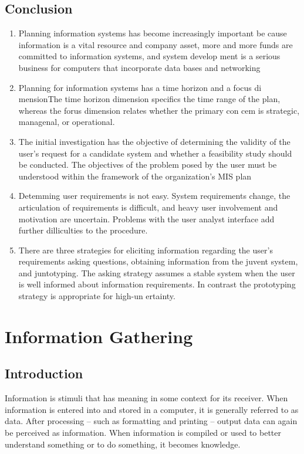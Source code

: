 \documentclass[a4paper,12pt]{report}
\begin{document}
\section{Conclusion}
\begin{enumerate}
	\item Planning information systems has become increasingly important be cause information is a vital resource and company asset, more and more funds are committed to information systems, and system develop ment is a serious business for computers that incorporate data bases and networking
	\item Planning for information systems has a time horizon and a focus di mensionThe time horizon dimension specifics the time range of the plan, whereas the forus dimension relates whether the primary con cem is strategic, managenal, or operational.
	\item The initial investigation has the objective of determining the validity of the user's request for a candidate system and whether a feasibility study should be conducted. The objectives of the problem posed by the user must be understood within the framework of the organization's MIS plan
	\item Detemming user requirements is not easy. System requirements change, the articulation of requirements is difficult, and heavy user involvement and motivation are uncertain. Problems with the user analyst interface add further dilliculties to the procedure.
	\item There are three strategies for eliciting information regarding the user's requirements asking questions, obtaining information from the juvent system, and juntotyping. The asking strategy assumes a stable system when the user is well informed about information requirements. In contrast the prototyping strategy is appropriate for high-un ertainty.
\end{enumerate}





\chapter{Information Gathering}
\section{Introduction}
Information is stimuli that has meaning in some context for its receiver. When information is entered into and stored in a computer, it is generally referred to as data. After processing -- such as formatting and printing -- output data can again be perceived as information. When information is compiled or used to better understand something or to do something, it becomes knowledge.
\end{document}
